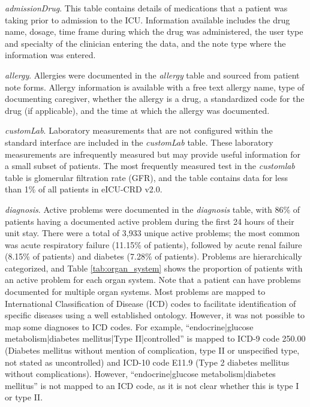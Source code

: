 \documentclass[english]{article}
\newcommand{\tblname}[1]{\emph{#1}}
\begin{document}
\tblname{admissionDrug}. This table contains details of medications that a patient was taking prior to admission to the ICU.
Information available includes the drug name, dosage, time frame during which the drug was administered, the user type and specialty of the clinician entering the data, and the note type where the information was entered.

\tblname{allergy}. Allergies were documented in the \tblname{allergy} table and sourced from patient note forms. Allergy information is available with a free text allergy name, type of documenting caregiver, whether the allergy is a drug, a standardized code for the drug (if applicable), and the time at which the allergy was documented.

\tblname{customLab}. Laboratory measurements that are not configured within the standard interface are included in the \tblname{customLab} table. These laboratory measurements are infrequently measured but may provide useful information for a small subset of patients. The most frequently measured test in the \tblname{customlab} table is glomerular filtration rate (GFR), and the table contains data for less than 1\% of all patients in eICU-CRD v2.0.

\tblname{diagnosis}. Active problems were documented in the \tblname{diagnosis} table,
with 86\% of patients having a documented active problem during
the first 24 hours of their unit stay. There were a total of 3,933
unique active problems; the most common was acute respiratory failure
(11.15\% of patients), followed by acute renal failure (8.15\% of
patients) and diabetes (7.28\% of patients). Problems are hierarchically
categorized, and Table \ref{tab:organ_system} shows the proportion of patients with an active problem for each organ system. Note that a patient can have problems
documented for multiple organ systems.
Most problems are mapped to International Classification of Disease (ICD) codes to facilitate identification of specific diseases using a well established ontology. However, it was not possible to map some diagnoses to ICD codes. For example, ``endocrine|glucose metabolism|diabetes mellitus|Type II|controlled'' is mapped to ICD-9 code 250.00 (Diabetes mellitus without mention of complication, type II or unspecified type, not stated as uncontrolled) and ICD-10 code E11.9 (Type 2 diabetes mellitus without complications).
However, ``endocrine|glucose metabolism|diabetes mellitus'' is not mapped to an ICD code, as it is not clear whether this is type I or type II.
\end{document}
